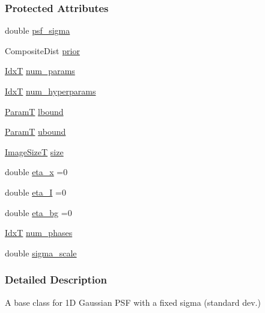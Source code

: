 \subsubsection*{Protected Attributes}
\begin{DoxyCompactItemize}
\item 
double \hyperlink{classmappel_1_1Gauss1DModel_a62c6b2a5d8ab5f5596504a19daed66b2}{psf\+\_\+sigma}
\item 
Composite\+Dist \hyperlink{classmappel_1_1PointEmitterModel_a393839f8eb1dd3d61c9369377742ba0e}{prior}
\item 
\hyperlink{namespacemappel_ab17ec0f30b61ece292439d7ece81d3a8}{IdxT} \hyperlink{classmappel_1_1PointEmitterModel_a9af0484391bd6021ddc04ac666ab49ad}{num\+\_\+params}
\item 
\hyperlink{namespacemappel_ab17ec0f30b61ece292439d7ece81d3a8}{IdxT} \hyperlink{classmappel_1_1PointEmitterModel_ab2423214fdd81c8212118770b5b17b1f}{num\+\_\+hyperparams}
\item 
\hyperlink{classmappel_1_1PointEmitterModel_a665ec6aea3aac139bb69a23c06d4b9a1}{ParamT} \hyperlink{classmappel_1_1PointEmitterModel_a889bc82f74cfa654da121e5770296ab2}{lbound}
\item 
\hyperlink{classmappel_1_1PointEmitterModel_a665ec6aea3aac139bb69a23c06d4b9a1}{ParamT} \hyperlink{classmappel_1_1PointEmitterModel_a35b883e84b6a2e0093bdf482c623beef}{ubound}
\item 
\hyperlink{classmappel_1_1ImageFormat1DBase_a6456bab2b26702022ee32ae19e90dcac}{Image\+SizeT} \hyperlink{classmappel_1_1ImageFormat1DBase_a8941b4d028e4dd881146a7c1b9039bb1}{size}
\item 
double \hyperlink{classmappel_1_1MCMCAdaptor1D_ae5787e38c9cef6168acf6fc5d3216693}{eta\+\_\+x} =0
\item 
double \hyperlink{classmappel_1_1MCMCAdaptor1D_a5780d326be0c40e10d6c91777cfffbd3}{eta\+\_\+I} =0
\item 
double \hyperlink{classmappel_1_1MCMCAdaptor1D_af54c93421b8e298289cbb92743c6b3d5}{eta\+\_\+bg} =0
\item 
\hyperlink{namespacemappel_ab17ec0f30b61ece292439d7ece81d3a8}{IdxT} \hyperlink{classmappel_1_1MCMCAdaptorBase_a44b90a984ace712584074dc17831fe25}{num\+\_\+phases}
\item 
double \hyperlink{classmappel_1_1MCMCAdaptorBase_a76312f7d589bf3f3e754beca174b884b}{sigma\+\_\+scale}
\end{DoxyCompactItemize}


\subsubsection{Detailed Description}
A base class for 1D Gaussian P\+SF with a fixed sigma (standard dev.) 

